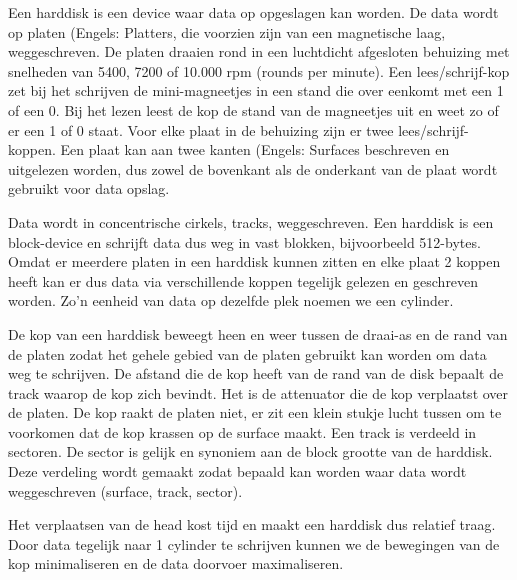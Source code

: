 Een harddisk is een device waar data op opgeslagen kan worden. De data wordt op platen (Engels: Platters, die voorzien zijn van een magnetische laag, weggeschreven. De platen draaien rond in een luchtdicht afgesloten behuizing met snelheden van 5400, 7200 of 10.000 rpm (rounds per minute). Een lees/schrijf-kop zet bij het schrijven de mini-magneetjes in een stand die over eenkomt met een 1 of een 0. Bij het lezen leest de kop de stand van de magneetjes uit en weet zo of er een 1 of 0 staat. Voor elke plaat in de behuizing zijn er twee lees/schrijf-koppen. Een plaat kan aan twee kanten (Engels: Surfaces beschreven en uitgelezen worden, dus zowel de bovenkant als de onderkant van de plaat wordt gebruikt voor data opslag.

Data wordt in concentrische cirkels, tracks, weggeschreven. Een harddisk is een block-device en schrijft data dus weg in vast blokken, bijvoorbeeld 512-bytes. Omdat er meerdere platen in een harddisk kunnen zitten en elke plaat 2 koppen heeft kan er dus data via verschillende koppen tegelijk gelezen en geschreven worden. Zo'n eenheid van data op dezelfde plek noemen we een cylinder. 

De kop van een harddisk beweegt heen en weer tussen de draai-as en de rand van de platen zodat het gehele gebied van de platen gebruikt kan worden om data weg te schrijven. De afstand die de kop heeft van de rand van de disk bepaalt de track waarop de kop zich bevindt. Het is de attenuator die de kop verplaatst over de platen. De kop raakt de platen niet, er zit een klein stukje lucht tussen om te voorkomen dat de kop krassen op de surface maakt. Een track is verdeeld in sectoren. De sector is gelijk en synoniem aan de block grootte van de harddisk. Deze verdeling wordt gemaakt zodat bepaald kan worden waar data wordt weggeschreven (surface, track, sector).

Het verplaatsen van de head kost tijd en maakt een harddisk dus relatief traag. Door data tegelijk naar 1 cylinder te schrijven kunnen we de bewegingen van de kop minimaliseren en de data doorvoer maximaliseren.
